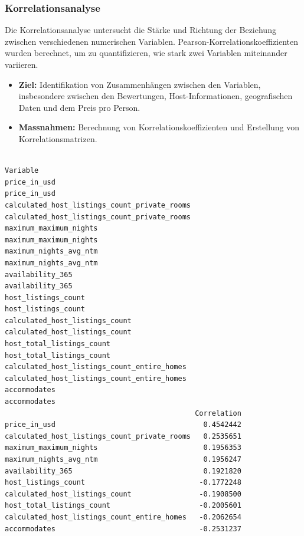 \documentclass[
  journal,
]{IEEEtran}%
\begin{document}
\subsubsection{\texorpdfstring{\textbf{Korrelationsanalyse}}{Korrelationsanalyse}}\label{korrelationsanalyse}

Die Korrelationsanalyse untersucht die Stärke und Richtung der Beziehung
zwischen verschiedenen numerischen Variablen.
Pearson-Korrelationskoeffizienten wurden berechnet, um zu
quantifizieren, wie stark zwei Variablen miteinander variieren.

\begin{itemize}
\item
  \textbf{Ziel:} Identifikation von Zusammenhängen zwischen den
  Variablen, insbesondere zwischen den Bewertungen, Host-Informationen,
  geografischen Daten und dem Preis pro Person.
\item
  \textbf{Massnahmen:} Berechnung von Korrelationskoeffizienten und
  Erstellung von Korrelationsmatrizen.
\end{itemize}

\begin{verbatim}
                                                                                 Variable
price_in_usd                                                                 price_in_usd
calculated_host_listings_count_private_rooms calculated_host_listings_count_private_rooms
maximum_maximum_nights                                             maximum_maximum_nights
maximum_nights_avg_ntm                                             maximum_nights_avg_ntm
availability_365                                                         availability_365
host_listings_count                                                   host_listings_count
calculated_host_listings_count                             calculated_host_listings_count
host_total_listings_count                                       host_total_listings_count
calculated_host_listings_count_entire_homes   calculated_host_listings_count_entire_homes
accommodates                                                                 accommodates
                                             Correlation
price_in_usd                                   0.4542442
calculated_host_listings_count_private_rooms   0.2535651
maximum_maximum_nights                         0.1956353
maximum_nights_avg_ntm                         0.1956247
availability_365                               0.1921820
host_listings_count                           -0.1772248
calculated_host_listings_count                -0.1908500
host_total_listings_count                     -0.2005601
calculated_host_listings_count_entire_homes   -0.2062654
accommodates                                  -0.2531237
\end{verbatim}
\end{document}
